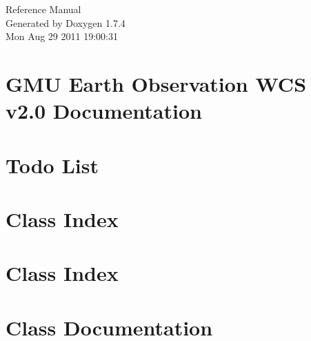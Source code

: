 \documentclass[a4paper]{book}
\begin{document}
\hypersetup{pageanchor=false}
\begin{titlepage}
\vspace*{7cm}
\begin{center}
{\Large Reference Manual}\\
\vspace*{1cm}
{\large Generated by Doxygen 1.7.4}\\
\vspace*{0.5cm}
{\small Mon Aug 29 2011 19:00:31}\\
\end{center}
\end{titlepage}
\clearemptydoublepage
{}
\tableofcontents
\clearemptydoublepage
{}
\hypersetup{pageanchor=true}
\chapter{GMU Earth Observation WCS v2.0 Documentation}
\label{index}\hypertarget{index}{}
\chapter{Todo List}
\label{todo}
\hypertarget{todo}{}

\chapter{Class Index}

\chapter{Class Index}

\chapter{Class Documentation}























\printindex
\end{document}
